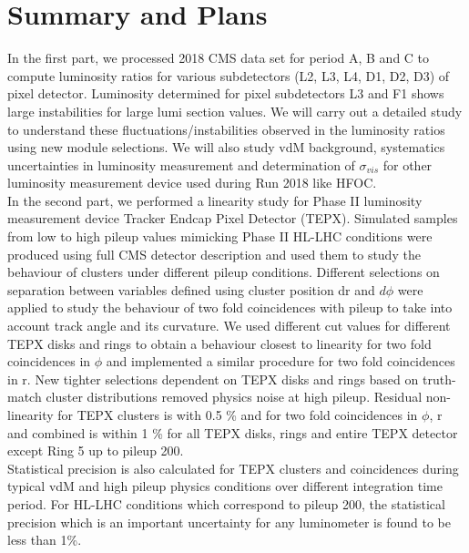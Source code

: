 \newpage \section{Summary and Plans} 
\label{sec:conclusion}

In the first part, we processed 2018 CMS data set for period A, B and C to compute luminosity ratios for various subdetectors (L2, L3, L4, D1, D2, D3) of pixel detector. Luminosity determined for pixel subdetectors L3 and F1 shows large instabilities for large lumi section values. We will carry out a detailed study to understand these fluctuations/instabilities observed in the luminosity ratios using new module selections. We will also study vdM background, systematics uncertainties in luminosity measurement and determination of $\sigma_{vis}$ for other luminosity measurement device used during Run 2018 like HFOC.\\

In the second part, we performed a linearity study for Phase II luminosity measurement device Tracker Endcap Pixel Detector (TEPX). Simulated samples from low to high pileup values mimicking Phase II HL-LHC conditions were produced using full CMS detector description and used them to study the behaviour of clusters under different pileup conditions. Different selections on separation between variables defined using cluster position dr and $d\phi$ were applied to study the behaviour of two fold coincidences with pileup to take into account track angle and its curvature. We used different cut values for different TEPX disks and rings to obtain a behaviour closest to linearity for two fold coincidences in $\phi$ and implemented a similar procedure for two fold coincidences in r. New tighter selections dependent on TEPX disks and rings based on truth-match cluster distributions removed physics noise at high pileup. Residual non-linearity for TEPX clusters is with 0.5 \% and for two fold coincidences in $\phi$, r and combined is within 1 \% for all TEPX disks, rings and entire TEPX detector except Ring 5 up to pileup 200.\\
 
Statistical precision is also calculated for TEPX clusters and coincidences during typical vdM and high pileup physics conditions over different integration time period. For HL-LHC conditions which correspond to pileup 200, the statistical precision which is an important uncertainty for any luminometer is found to be less than 1\%.
